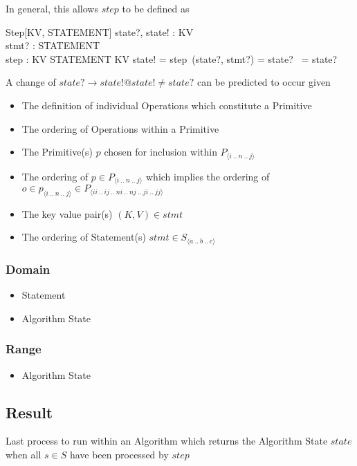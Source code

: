 \documentclass[../main.tex]{subfiles}
\begin{document}
In general, this allows $step$ to be defined as
\begin{schema}{Step[KV, STATEMENT]}
  state?, state! : KV \\
  stmt? : STATEMENT \\
  step : KV \cross STATEMENT \fun KV
  \where
  state! = step~(state?, stmt?) = state? ~\lor \not= state?
\end{schema}
A change of $state? \to state! @ state! \not= state?$ can be predicted to occur given
\begin{itemize}
\item The definition of individual Operations which constitute a Primitive
\item The ordering of Operations within a Primitive
\item The Primitive(s) $p$ chosen for inclusion within $P_{\langle i~..~n~..~j \rangle}$
\item The ordering of $p \in P_{\langle i~..~n~..~j \rangle}$ which implies the ordering of $o \in p_{\langle i~..~n~..~j \rangle} \in P_{\langle ii~..~ij~..~ni~..~nj~..~ji~..~jj \rangle}$
\item The key value pair(s) $(K, V) \in stmt$
\item The ordering of Statement(s) $stmt \in S_{\langle a~..~b~..~c \rangle}$
\end{itemize}

\subsubsection{Domain}

\begin{itemize}
\item Statement
\item Algorithm State
\end{itemize}

\subsubsection{Range}

\begin{itemize}
\item Algorithm State
\end{itemize}

\subsection{Result}

Last process to run within an Algorithm which returns the Algorithm State $state$
when all $s \in S$ have been processed by $step$
\end{document}
